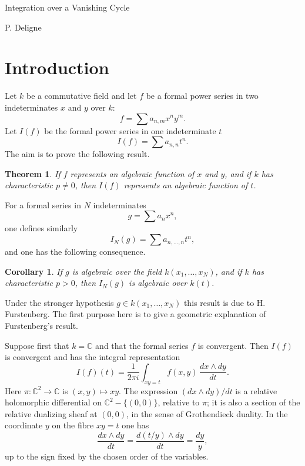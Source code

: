 \documentclass[11pt]{article}
\newtheorem{theorem}{Theorem}
\newtheorem{corollary}{Corollary}
\theoremstyle{remark}
\begin{document}
\begin{center}
 {\Large Integration over a Vanishing Cycle}\par
 \vspace{0.5em}
 {P. Deligne}\par
\end{center}

\section*{Introduction}

Let $k$ be a commutative field and let $f$ be a formal power series in two indeterminates $x$ and $y$ over $k$:
\[
 f=\sum a_{n,m}x^ny^m.
\]
Let $I(f)$ be the formal power series in one indeterminate $t$
\[
 I(f)=\sum a_{n,n}t^n.
\]
The aim is to prove the following result.

\begin{theorem}
If $f$ represents an algebraic function of $x$ and $y$, and if $k$ has characteristic $p\ne0$, then $I(f)$ represents an algebraic function of $t$.
\end{theorem}

For a formal series in $N$ indeterminates
\[
 g=\sum a_nx^n,
\]
one defines similarly
\[
 I_N(g)=\sum a_{n,\ldots,n}t^n,
\]
and one has the following consequence.

\begin{corollary}
If $g$ is algebraic over the field $k(x_1,\ldots,x_N)$, and if $k$ has characteristic $p>0$, then $I_N(g)$ is algebraic over $k(t)$.
\end{corollary}

Under the stronger hypothesis $g\in k(x_1,\ldots,x_N)$ this result is due to H. Furstenberg. The first purpose here is to give a geometric explanation of Furstenberg's result.

Suppose first that $k=\mathbb C$ and that the formal series $f$ is convergent. Then $I(f)$ is convergent and has the integral representation
\begin{equation}\tag{1}
 I(f)(t)=\frac1{2\pi i}\int_{xy=t} f(x,y)\,\frac{dx\wedge dy}{dt}.
\end{equation}
Here $\pi:\mathbb C^2\to\mathbb C$ is $(x,y)\mapsto xy$. The expression $(dx\wedge dy)/dt$ is a relative holomorphic differential on $\mathbb C^2-\{(0,0)\}$, relative to $\pi$; it is also a section of the relative dualizing sheaf at $(0,0)$, in the sense of Grothendieck duality. In the coordinate $y$ on the fibre $xy=t$ one has
\[
 \frac{dx\wedge dy}{dt}=\frac{d(t/y)\wedge dy}{dt}=\frac{dy}{y},
\]
up to the sign fixed by the chosen order of the variables.
\end{document}
